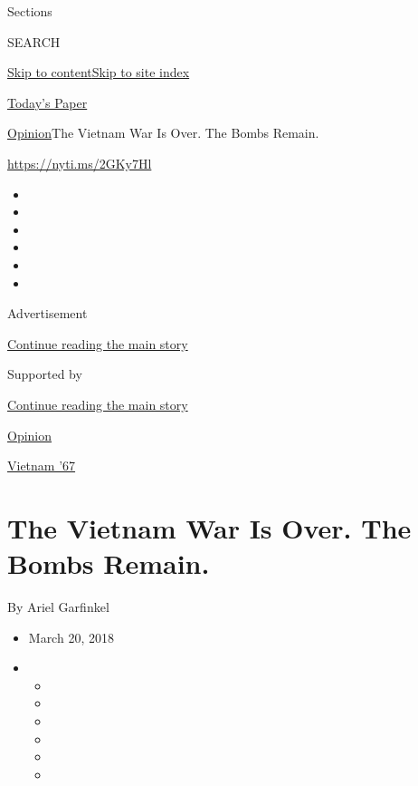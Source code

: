 Sections

SEARCH

\protect\hyperlink{site-content}{Skip to
content}\protect\hyperlink{site-index}{Skip to site index}

\href{https://myaccount.nytimes.com/auth/login?response_type=cookie\&client_id=vi}{}

\href{https://www.nytimes.com/section/todayspaper}{Today's Paper}

\href{/section/opinion}{Opinion}\textbar{}The Vietnam War Is Over. The
Bombs Remain.

\href{https://nyti.ms/2GKy7Hl}{https://nyti.ms/2GKy7Hl}

\begin{itemize}
\item
\item
\item
\item
\item
\item
\end{itemize}

Advertisement

\protect\hyperlink{after-top}{Continue reading the main story}

Supported by

\protect\hyperlink{after-sponsor}{Continue reading the main story}

\href{/section/opinion}{Opinion}

\href{/column/vietnam-67}{Vietnam '67}

\hypertarget{the-vietnam-war-is-over-the-bombs-remain}{%
\section{The Vietnam War Is Over. The Bombs
Remain.}\label{the-vietnam-war-is-over-the-bombs-remain}}

By Ariel Garfinkel

\begin{itemize}
\item
  March 20, 2018
\item
  \begin{itemize}
  \item
  \item
  \item
  \item
  \item
  \item
  \end{itemize}
\end{itemize}

